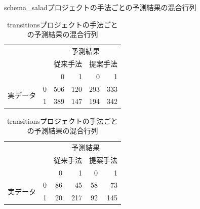 \documentclass[submit,noauthor,ses,dvipdfmx]{ipsj}
\begin{document}
\begin{table}[tb]
    \label{tab:schema_salad}
    \centering
    \caption{schema\_saladプロジェクトの手法ごとの予測結果の混合行列}
    \vspace{2mm}
    \begin{tabular}{ll|r|r||r|r}
    \hline
        ~ & ~ & \multicolumn{4}{c}{予測結果} \\ \cline{3-6}
        ~ & ~ & \multicolumn{2}{c||}{従来手法} & \multicolumn{2}{c}{提案手法} \\ \cline{3-6}
        & ~ & 0 & 1 & 0 & 1 \\ \hline
        \multirow{2}{*}{実データ} & \multicolumn{1}{|c|}{0} & 506 & 120 & 293 & 333\\ \cline{2-6}
        & \multicolumn{1}{|c|}{1} & 389 & 147 & 194 & 342\\ \hline
    \end{tabular}

    \vspace{4mm}
    \centering
    \label{tab:transitions}
    \caption{transitionsプロジェクトの手法ごとの予測結果の混合行列}
    \vspace{2mm}
    \begin{tabular}{ll|r|r||r|r}
    \hline
        ~ & ~ & \multicolumn{4}{c}{予測結果} \\ \cline{3-6}
        ~ & ~ & \multicolumn{2}{c||}{従来手法} & \multicolumn{2}{c}{提案手法} \\ \cline{3-6}
        & ~ & 0 & 1 & 0 & 1 \\ \hline
        \multirow{2}{*}{実データ} & \multicolumn{1}{|c|}{0} & 86 & 45 & 58 & 73 \\ \cline{2-6}
        & \multicolumn{1}{|c|}{1} & 20 & 217 & 92 & 145 \\ \hline
    \end{tabular}
\end{table}





\end{document}
